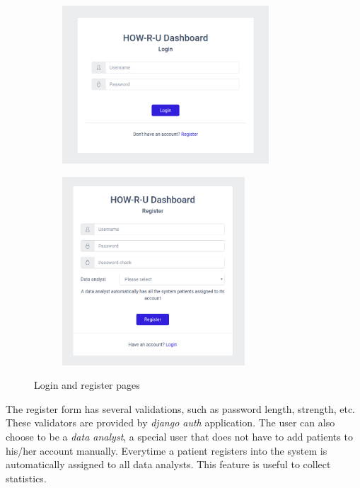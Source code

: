 \documentclass[12pt,english]{article}
\begin{document}
\begin{figure}[H]
  \begin{subfigure}[t]{0.4\textwidth}
    \centering
    \includegraphics[width=0.85\textwidth]{login.png}
  \end{subfigure}
  \hspace{3cm}
  \begin{subfigure}[t]{0.4\textwidth}
    \centering
    \includegraphics[width=0.75\textwidth]{register.png}
  \end{subfigure}
  \caption{Login and register pages}
\end{figure}

The register form has several validations, such as password length, strength, etc. These validators are provided by \emph{django auth} application. The user can also choose to be a \emph{data analyst}, a special user that does not have to add patients to his/her account manually. Everytime a patient registers into the system is automatically assigned to all data analysts. This feature is useful to collect statistics.
\end{document}
